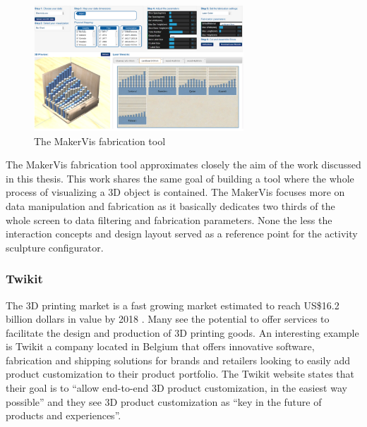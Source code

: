 \documentclass[../medieninformatik-arbeit.tex]{subfiles}
\begin{document}
\begin{figure}[h]
\begin{center}
  \includegraphics[width=0.7\textwidth]{RelatedWork/img/MakerVis}
  \caption{The MakerVis fabrication tool \cite{swaminathan2014supporting} }
\label{fig:makervis-config}
\end{center}
\end{figure}

The MakerVis fabrication tool approximates closely the aim of the work discussed in this thesis. This work shares the same goal of building a tool where the whole process of visualizing a 3D object is contained. The MakerVis focuses more on data manipulation and fabrication as it basically dedicates two thirds of the whole screen to data filtering and fabrication parameters. None the less the interaction concepts and design layout served as a reference point for the activity sculpture configurator. 

\subsubsection{Twikit}
The 3D printing market is a fast growing market estimated to reach US\$16.2 billion dollars in value by 2018 \cite{canalys2014trends}. Many see the potential to offer services to facilitate the design and production of 3D printing goods. An interesting example is 
Twikit \cite{twikit2015tech} a company located in Belgium that offers innovative software, fabrication and shipping solutions for brands and retailers looking to easily add product customization to their product portfolio. The Twikit website \cite{twikit2015tech} states that their goal is to ``allow end-to-end 3D product customization, in the easiest way possible'' and they see 3D product customization as ``key in the future of products and experiences''.
\end{document}
